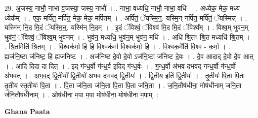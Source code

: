 \documentclass[17pt]{extarticle}
\begin{document}
29. अ॒जस्य॒ नाभौ॒ नाभा॑ व॒जस्या॒ जस्य॒ नाभौ᳚ । . नाभा॒ वध्यधि॒ नाभौ॒ नाभा॒ वधि॑ । . अध्येक॒ मेक॒ मध्य ध्येक᳚म् । . एक॒ मर्पि॑त॒ मर्पि॑त॒ मेक॒ मेक॒ मर्पि॑तम् । . अर्पि॑तं॒ ॅयस्मि॒न्॒. यस्मि॒न् नर्पि॑त॒ मर्पि॑तं॒ ॅयस्मिन्न्॑ । . यस्मि॑न् नि॒द मि॒दं ॅयस्मि॒न्॒. यस्मि॑न् नि॒दम् । . इ॒दं ॅविश्वं॒ ॅविश्व॑ मि॒द मि॒दं ॅविश्व᳚म् । . विश्व॒म् भुव॑न॒म् भुव॑नं॒ ॅविश्वं॒ ॅविश्व॒म् भुव॑नम् । . भुव॑न॒ मध्यधि॒ भुव॑न॒म् भुव॑न॒ मधि॑ । . अधि॑ श्रि॒तꣳ श्रि॒त मध्यधि॑ श्रि॒तम् । . श्रि॒तमिति॑ श्रि॒तम् । . वि॒श्वक॑र्मा॒ हि हि वि॒श्वक॑र्मा वि॒श्वक॑र्मा॒ हि । . वि॒श्वक॒र्मेति॑ वि॒श्व - क॒र्मा॒ । . ह्यज॑नि॒ष्टा ज॑निष्ट॒ हि ह्यज॑निष्ट । . अज॑निष्ट दे॒वो दे॒वो ऽज॑नि॒ष्टा ज॑निष्ट दे॒वः । . दे॒व आदाद् दे॒वो दे॒व आत् । . आदि दिदा दा दित् । . इद् ग॑न्ध॒र्वो ग॑न्ध॒र्व इदिद् ग॑न्ध॒र्वः । . ग॒न्ध॒र्वो अ॑भव दभवद् गन्ध॒र्वो ग॑न्ध॒र्वो अ॑भवत् । . अ॒भ॒व॒द् द्वि॒तीयो᳚ द्वि॒तीयो॑ अभव दभवद् द्वि॒तीयः॑ । . द्वि॒तीय॒ इति॑ द्वि॒तीयः॑ । . तृ॒तीयः॑ पि॒ता पि॒ता तृ॒तीय॑ स्तृ॒तीयः॑ पि॒ता । . पि॒ता ज॑नि॒ता ज॑नि॒ता पि॒ता पि॒ता ज॑नि॒ता । . ज॒नि॒तौष॑धीना॒ मोष॑धीनाम् जनि॒ता ज॑नि॒तौष॑धीनाम् । . ओष॑धीना म॒पा म॒पा मोष॑धीना॒ मोष॑धीना म॒पाम् । \newline

\textbf{Ghana Paata } \newline
\end{document}
